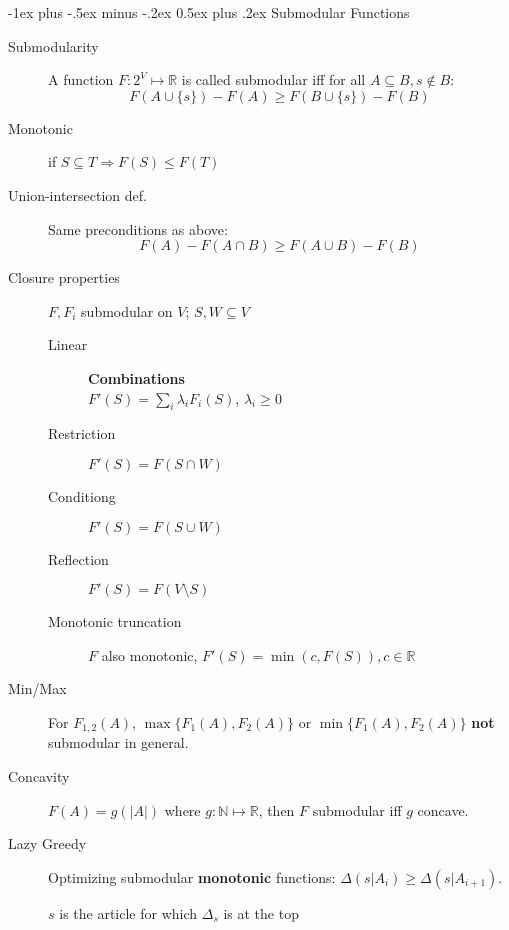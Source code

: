 \documentclass[11pt,landscape]{article}
\makeatletter
\renewcommand{\subsection}{\@startsection{subsection}{2}{0mm}%
                                {-1ex plus -.5ex minus -.2ex}%
                                {0.5ex plus .2ex}%
                                {\color{subsectionColor}\normalfont\normalsize\bfseries}}
\makeatother
\begin{document}
\begin{multicols}{3}
\subsection{Submodular Functions}
\begin{description}
    \item[Submodularity] A function $F: 2^V \mapsto \mathbb{R}$ is called submodular iff for all $A \subseteq B, s \notin B$:
        $$F(A \cup \{s\}) - F(A) \geq F(B \cup \{s\}) - F(B)$$
    \item[Monotonic] if $S \subseteq T \Rightarrow F(S) \leq F(T)$
    \item[Union-intersection def.] Same preconditions as above: $$F(A) - F(A\cap B) \geq F(A\cup B) - F(B)$$
    \item[Closure properties] $F, F_i$ submodular on $V$; $S, W \subseteq V$
    \begin{description}
        \item[Linear] \textbf{Combinations}\\ $F'(S) = \sum_{i} \lambda_i F_i(S)$, $\lambda_i \geq 0$
        \item[Restriction] $F'(S) = F(S \cap W)$
        \item[Conditiong] $F'(S) = F(S \cup W)$
        \item[Reflection] $F'(S) = F(V \setminus S)$
        \item[Monotonic truncation] $F$ also monotonic, $F'(S) = \min(c, F(S)), c \in \mathbb{R}$
    \end{description}
    \item[Min/Max] For $F_{1,2}(A)$, $\max \{F_1(A),F_2(A) \}$ or $\min \{F_1(A),F_2(A) \}$ \textbf{not} submodular in general.
    \item[Concavity]
    $F(A) = g(|A|)$ where $g: \mathbb{N} \mapsto \mathbb{R}$, then $F$ submodular iff $g$ concave.
\item[Lazy Greedy] Optimizing submodular \textbf{monotonic} functions: $\Delta(s|A_i) \geq \Delta(s|A_{i+1})$.
    \begin{algorithmic}[1]
            \State $s$ is the article for which $\Delta_s$ is at the top
            \EndIf
        \EndFor
\end{algorithmic}
\end{description}

\end{multicols}
\end{document}
